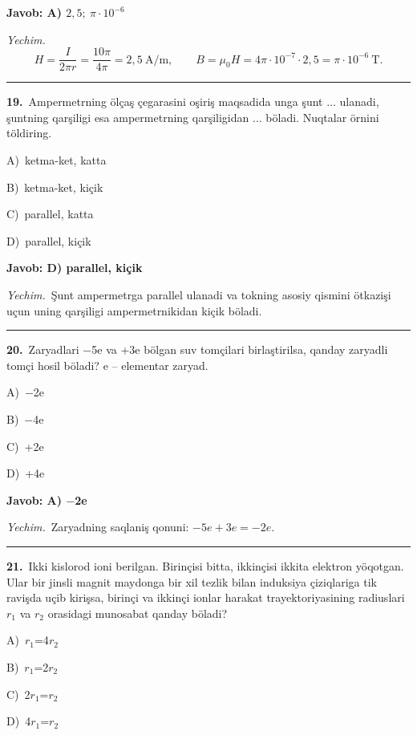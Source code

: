 \documentclass[11pt,a4paper]{article}
\newcommand{\opt}[2]{\hspace*{4mm}#1)\ #2\par}
\begin{document}
\noindent\colorbox{gray!12}{\parbox{\dimexpr\linewidth-2\fboxsep}{\textbf{Javob: A) $2{,}5;\ \pi\cdot10^{-6}$}}}\par\smallskip
\noindent\textit{Yechim.}\ \[H=\frac{I}{2\pi r}=\frac{10\pi}{4\pi}=2{,}5\ \text{A/m},\qquad B=\mu_0H=4\pi\cdot10^{-7}\cdot2{,}5=\pi\cdot10^{-6}\ \text{T}.\]\par\medskip\hrule\medskip
{}\noindent\begin{minipage}{\linewidth}
\textbf{19.}\ Ampermetrning ölçaş çegarasini oşiriş maqsadida unga şunt $\ldots$ ulanadi, şuntning qarşiligi esa ampermetrning qarşiligidan $\ldots$ böladi. Nuqtalar örnini töldiring.\par\smallskip
\opt{A}{ketma-ket, katta}
\opt{B}{ketma-ket, kiçik}
\opt{C}{parallel, katta}
\opt{D}{parallel, kiçik}
\end{minipage}\vspace{2pt}\par
\noindent\colorbox{gray!12}{\parbox{\dimexpr\linewidth-2\fboxsep}{\textbf{Javob: D) parallel, kiçik}}}\par\smallskip
\noindent\textit{Yechim.}\ Şunt ampermetrga parallel ulanadi va tokning asosiy qismini ötkazişi uçun uning qarşiligi ampermetrnikidan kiçik böladi.\par\par\medskip\hrule\medskip
{}\noindent\begin{minipage}{\linewidth}
\textbf{20.}\ Zaryadlari $-$5e va +3e bölgan suv tomçilari birlaştirilsa, qanday zaryadli tomçi hosil böladi? e – elementar zaryad.\par\smallskip
\opt{A}{$-$2e}
\opt{B}{$-$4e}
\opt{C}{+2e}
\opt{D}{+4e}
\end{minipage}\vspace{2pt}\par
\noindent\colorbox{gray!12}{\parbox{\dimexpr\linewidth-2\fboxsep}{\textbf{Javob: A) $-$2e}}}\par\smallskip
\noindent\textit{Yechim.}\ Zaryadning saqlaniş qonuni: $-5e+3e=-2e$.\par\par\medskip\hrule\medskip
{}\noindent\begin{minipage}{\linewidth}
\textbf{21.}\ Ikki kislorod ioni berilgan. Birinçisi bitta, ikkinçisi ikkita elektron yöqotgan. Ular bir jinsli magnit maydonga bir xil tezlik bilan induksiya çiziqlariga tik ravişda uçib kirişsa, birinçi va ikkinçi ionlar harakat trayektoriyasining radiuslari $r_1$ va $r_2$ orasidagi munosabat qanday böladi?\par\smallskip
\opt{A}{$r_1$=4$r_2$}
\opt{B}{$r_1$=2$r_2$}
\opt{C}{2$r_1$=$r_2$}
\opt{D}{4$r_1$=$r_2$}
\end{minipage}\vspace{2pt}\par
\end{document}

